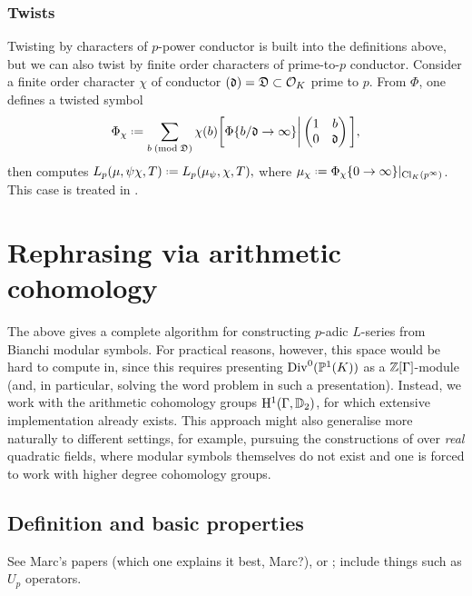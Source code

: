 \documentclass[a4paper,11pt]{article}
\numberwithin{equation}{section}
\begin{document}
\subsubsection{Twists}
Twisting by characters of $p$-power conductor is built into the definitions above, but we can also twist by finite order characters of prime-to-$p$ conductor. Consider a finite order character $\chi$ of conductor $(\mathfrak{d}) = \mathfrak{D} \subset \mathcal{O}_K$ prime to $p$. From $\Phi$, one defines a twisted symbol
\[
	\Phi_\chi \defeq \sum_{b \newmod{\mathfrak{D}}} \chi(b) \bigg[\Phi\{b/\mathfrak{d} \rightarrow \infty\}\bigg| \matrd{1}{b}{0}{\mathfrak{d}}\bigg],
\]
then computes $L_p(\mu,\psi\chi,T) \defeq L_p(\mu_\psi,\chi,T),$ where $\mu_\chi \defeq \Phi_\chi\{0\rightarrow \infty\}|_{\cl_K(p^\infty)}$. This case is treated in \cite[\S3.4]{BW17}.












\section{Rephrasing via arithmetic cohomology}
The above gives a complete algorithm for constructing $p$-adic $L$-series from Bianchi modular symbols. For practical reasons, however, this space would be hard to compute in, since this requires presenting $\mathrm{Div}^0(\mathbb{P}^1(K))$ as a $\mathbb{Z}[\Gamma]$-module (and, in particular, solving the word problem in such a presentation). Instead, we work with the arithmetic cohomology groups $\mathrm{H}^1(\Gamma,\mathbb{D}_2)$, for which extensive implementation already exists. This approach might also generalise more naturally to different settings, for example, pursuing the constructions of \cite{Bar15} over \emph{real} quadratic fields, where modular symbols themselves do not exist and one is forced to work with higher degree cohomology groups.

\subsection{Definition and basic properties}
See Marc's papers (which one explains it best, Marc?), or  \cite{PP09}; include things such as $U_p$ operators.
\end{document}
